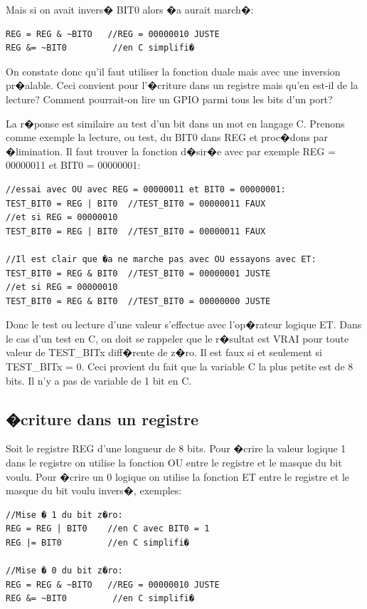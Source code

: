Mais si on avait invers� BIT0 alors �a aurait march�:

\lstset{style=customc}
\begin{lstlisting}
REG = REG & ~BITO   //REG = 00000010 JUSTE 
REG &= ~BIT0         //en C simplifi�
\end{lstlisting}

On constate donc qu'il faut utiliser la fonction duale mais avec une inversion pr�alable. Ceci convient pour l'�criture dans un registre mais qu'en est-il de la lecture? Comment pourrait-on lire un GPIO parmi tous les bits d'un port?

La r�ponse est similaire au test d'un bit dans un mot en langage C. Prenons comme exemple la lecture, ou test, du BIT0 dans REG et proc�dons par �limination. Il faut trouver la fonction d�sir�e avec par exemple REG = 00000011 et BIT0 = 00000001:

\lstset{style=customc}
\begin{lstlisting}
//essai avec OU avec REG = 00000011 et BIT0 = 00000001:
TEST_BIT0 = REG | BIT0  //TEST_BIT0 = 00000011 FAUX
//et si REG = 00000010
TEST_BIT0 = REG | BIT0  //TEST_BIT0 = 00000011 FAUX

//Il est clair que �a ne marche pas avec OU essayons avec ET:
TEST_BIT0 = REG & BIT0  //TEST_BIT0 = 00000001 JUSTE
//et si REG = 00000010
TEST_BIT0 = REG & BIT0  //TEST_BIT0 = 00000000 JUSTE
\end{lstlisting}

Donc le test ou lecture d'une valeur s'effectue avec l'op�rateur logique ET. Dans le cas d'un test en C, on doit se rappeler que le r�sultat est VRAI pour toute valeur de TEST\_BITx diff�rente de z�ro. Il est faux si et seulement si TEST\_BITx = 0. Ceci provient du fait que la variable C la plus petite est de 8 bits. Il n'y a pas de variable de 1 bit en C. 

\subsection{�criture dans un registre}

Soit le registre REG d'une longueur de 8 bits. Pour �crire la valeur logique 1 dans le registre on utilise la fonction OU entre le registre et le masque du bit voulu. Pour �crire un 0 logique on utilise la fonction ET entre le registre et le masque du bit voulu invers�, exemples:

\lstset{style=customc}
\begin{lstlisting}
//Mise � 1 du bit z�ro:
REG = REG | BIT0    //en C avec BIT0 = 1
REG |= BIT0		    //en C simplifi�

//Mise � 0 du bit z�ro:
REG = REG & ~BITO   //REG = 00000010 JUSTE 
REG &= ~BIT0         //en C simplifi�
\end{lstlisting}

